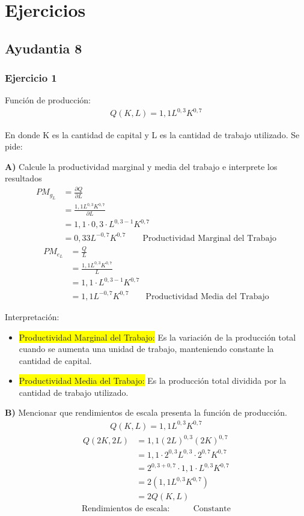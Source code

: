 \documentclass{templateNote}
\newcommand{\destacar}[1]{ \colorbox{yellow}{#1}}
\begin{document}
\newpage
\section{Ejercicios}
\subsection{Ayudantia 8}
\subsubsection{Ejercicio 1}
Función de producción:
\begin{align*}
    Q(K, L) = 1,1L^{0,3}K^{0,7}
\end{align*}

En donde K es la cantidad de capital y L es la cantidad de trabajo utilizado. Se pide:

\subitem \textbf{A)}  Calcule la productividad marginal y media del trabajo e interprete los resultados
\begin{align*}
    PM_{g_{L}} &= \frac{\partial Q}{\partial L} \\
    &= \frac{1,1 L^{0,3}K^{0,7}}{\partial L} \\
    &= 1,1 \cdot 0,3 \cdot L^{0,3 - 1}K^{0,7} \\
    &= 0,33L^{-0,7}K^{0,7} \qquad \text{Productividad Marginal del Trabajo}
\end{align*}
\begin{align*}
    PM_{e_{L}} &= \frac{Q}{L} \\
    &= \frac{1,1 L^{0,3}K^{0,7}}{L} \\
    &= 1,1 \cdot L^{0,3 - 1}K^{0,7} \\
    &= 1,1L^{-0,7}K^{0,7} \qquad \text{Productividad Media del Trabajo}
\end{align*}

Interpretación:
\begin{itemize}
    \item \destacar{Productividad Marginal del Trabajo:} Es la variación de la producción total cuando se aumenta una unidad de trabajo, manteniendo constante la cantidad de capital.
    \item \destacar{Productividad Media del Trabajo:} Es la producción total dividida por la cantidad de trabajo utilizado.
\end{itemize}

\subitem \textbf{B)} Mencionar que rendimientos de escala presenta la función de producción.
\begin{align*}
    Q(K, L) = 1,1L^{0,3}K^{0,7}
\end{align*}
\begin{align*}
    Q(2K, 2L) &= 1,1(2L)^{0,3}(2K)^{0,7} \\
    &= 1,1 \cdot 2^{0,3}L^{0,3} \cdot 2^{0,7}K^{0,7} \\
    &= 2^{0,3 + 0,7} \cdot 1,1 \cdot L^{0,3}K^{0,7} \\
    &= 2(1,1L^{0,3}K^{0,7}) \\
    &= 2Q(K, L)
\end{align*}
\begin{align*}
    \text{Rendimientos de escala:} \qquad & \text{Constante}
\end{align*}
\end{document}
